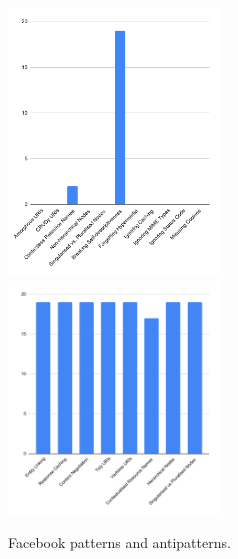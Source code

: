 \begin{figure}[htb!]

\includegraphics[width=0.5\textwidth]{img/barchart/facebookBarAnti.pdf}
\includegraphics[width=0.5\textwidth]{img/barchart/facebookBarPatt.pdf}
\caption{Facebook patterns and antipatterns.}
\label{fig:facebookBarPatt}

\end{figure}

